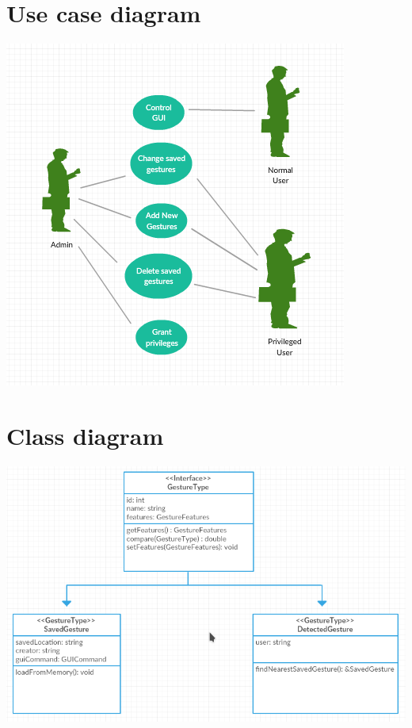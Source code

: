 \documentclass{scrreprt}
\begin{document}
\section{Use case diagram}
\begin{center}
    \includegraphics{usecase.png}
\end{center}
\section{Class diagram}
\begin{center}
    \includegraphics[scale=0.8]{classdiagram.png}
\end{center}
\end{document}
